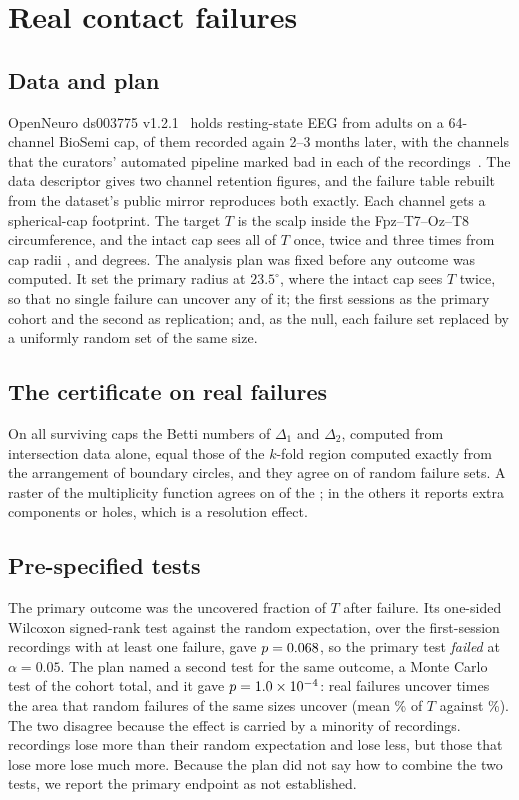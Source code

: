 \documentclass[11pt]{amsart}
\theoremstyle{definition}
\theoremstyle{remark}
\begin{document}
\section{Real contact failures}\label{sec:failures}

\subsection*{Data and plan} OpenNeuro ds003775 v1.2.1~\cite{ds003775} holds
resting-state EEG from \nTone{} adults on a 64-channel BioSemi cap, \nTtwo{}
of them recorded again 2--3 months later, with the channels that the
curators' automated pipeline marked bad in each of the \nRec{}
recordings~\cite{HatlestadHall2022}. The data descriptor gives two channel
retention figures, and the failure table rebuilt from the dataset's public
mirror reproduces both exactly. Each channel gets a spherical-cap footprint.
The target $T$ is the scalp inside the Fpz--T7--Oz--T8 circumference, and the
intact cap sees all of $T$ once, twice and three times from cap radii
\thetaOne, \thetaTwo{} and \thetaThree{} degrees. The analysis plan was fixed
before any outcome was computed. It set the primary radius at $23.5^\circ$,
where the intact cap sees $T$ twice, so that no single failure can uncover
any of it; the first sessions as the primary cohort and the second as
replication; and, as the null, each failure set replaced by a uniformly
random set of the same size.

\subsection*{The certificate on real failures}
On all \certExact{} surviving caps the Betti numbers of $\Delta_1$ and
$\Delta_2$, computed from intersection data alone, equal those of the $k$-fold
region computed exactly from the arrangement of boundary circles, and they
agree on \stressAgree{} of \stressSets{} random failure sets. A raster of the
multiplicity function agrees on \certRaster{} of the \certExact{}; in the
others it reports extra components or holes, which is a resolution effect.

\subsection*{Pre-specified tests}
The primary outcome was the uncovered fraction of $T$ after failure. Its
one-sided Wilcoxon signed-rank test against the random expectation, over the
\nWithFail{} first-session recordings with at least one failure, gave
$p=0.068$, so the primary test \emph{failed} at $\alpha=0.05$. The plan named
a second test for the same outcome, a Monte Carlo test of the cohort total,
and it gave $p=1.0\times 10^{-4}$: real failures uncover \PoneMCratio{} times the area
that random failures of the same sizes uncover (mean \PoneMeanObs\% of $T$
against \PoneMeanNull\%). The two disagree because the effect is carried by
a minority of recordings. \PonePos{} recordings lose more than their random
expectation and \PoneNeg{} lose less, but those that lose more lose much
more. Because the plan did not say how to combine the two tests, we
report the primary endpoint as not established.
\end{document}
